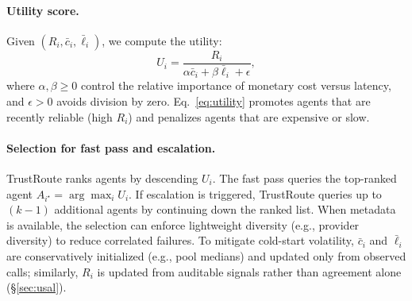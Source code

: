 \documentclass[acmsmall,screen,review,anonymous]{acmart}
\begin{document}
\paragraph{Utility score.}
Given $(R_i,\bar{c}_i,\bar{\ell}_i)$, we compute the utility:
\begin{equation}
U_i = \frac{R_i}{\alpha \bar{c}_i + \beta \bar{\ell}_i + \epsilon},
\label{eq:utility}
\end{equation}
where $\alpha,\beta\ge 0$ control the relative importance of monetary cost versus latency, and $\epsilon>0$ avoids division by zero.
Eq.~\ref{eq:utility} promotes agents that are recently reliable (high $R_i$) and penalizes agents that are expensive or slow.

\paragraph{Selection for fast pass and escalation.}
TrustRoute ranks agents by descending $U_i$.
The fast pass queries the top-ranked agent $A_{i^\star}=\arg\max_i U_i$.
If escalation is triggered, TrustRoute queries up to $(k-1)$ additional agents by continuing down the ranked list.
When metadata is available, the selection can enforce lightweight diversity (e.g., provider diversity) to reduce correlated failures.
To mitigate cold-start volatility, $\bar{c}_i$ and $\bar{\ell}_i$ are conservatively initialized (e.g., pool medians) and updated only from observed calls; similarly, $R_i$ is updated from auditable signals rather than agreement alone (\S\ref{sec:usal}).
\end{document}
